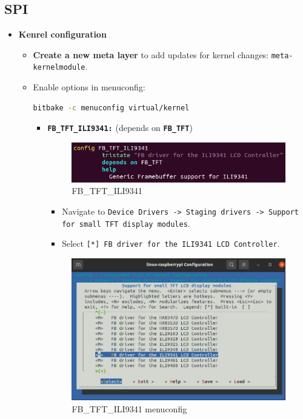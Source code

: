 \documentclass{article}
\begin{document}
\subsection{SPI}
\begin{itemize}
    \item \textbf{Kenrel configuration}
    \begin{itemize}
        \item \textbf{Create a new meta layer} to add updates for kernel changes: \texttt{meta-kernelmodule}.
        \item Enable options in menuconfig:
        \begin{lstlisting}[language=bash]
        bitbake -c menuconfig virtual/kernel
        \end{lstlisting}
        \begin{itemize}
            \item \texttt{\textbf{FB\_TFT\_ILI9341:}} (depends on \texttt{\textbf{FB\_TFT}})
            \begin{figure}[H]
                \centering
                \includegraphics[width=0.5\linewidth]{FB_TFT_ILI9341.png}
                \caption{FB\_TFT\_ILI9341}
                \label{fig:fb_tft_ili9341}
            \end{figure}
            \begin{itemize}
                \item Navigate to \texttt{Device Drivers -> Staging drivers -> Support for small TFT display modules}.
                \item Select \texttt{[*] FB driver for the ILI9341 LCD Controller}.
            \end{itemize}
            \begin{figure}[H]
                \centering
                \includegraphics[width=0.5\linewidth]{FB_TFT_ILI9341_menuconfig.png}
                \caption{FB\_TFT\_ILI9341 menuconfig}
                \label{fig:fb_tft_ili9341_menuconfig}
            \end{figure}
            

\end{itemize}
\end{itemize}
\end{itemize}
\end{document}

